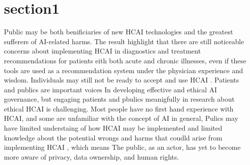 \documentclass[paper=a4, fontsize=11pt]{scrartcl} %
\numberwithin{equation}{section} %
\numberwithin{figure}{section} %
\numberwithin{table}{section} %
\begin{document}
\section{section1}
Public may be both benificiaries of new HCAI technologies and the greatest sufferers of AI-related harms. The result highlight that there are still noticeable concerns about 
implementing HCAI in diagnostics and treatment recommendations for patients eith both acute and chronic illnesses, even if these tools are used as a recommendation system under the 
physician experience and wisdom. Individuals may still not be ready to accept and use HCAI \cite{esmaeilzadehPatientsPerceptionsHuman2021}. Patients and publics are important voices In
developing effective and ethical AI governance, but engaging patients and pbulics meanigfully in research about ethical HCAI is challenging. Most people have no first hand experience with HCAI,
and some are unfamiliar with the concept of AI in general, Pulics may have limited understaing of how HCAI may be implemented and limited knowledge about the potential wrongs and harms that coudld
arise from implementing HCAI \cite{frostPublicViewsEthical2022}, which means The public, as an actor, has yet to become more aware of privacy, data ownership, and human rights.
\end{document}
